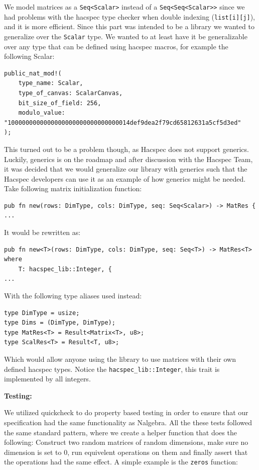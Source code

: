 \documentclass{article}
\begin{document}
We model matrices as a \texttt{Seq<Scalar>} instead of a
\texttt{Seq<Seq<Scalar>>} since we had problems with the hacspec type
checker when double indexing (\texttt{list[i][j]}), and it is more
efficient. Since this part was intended to be a library we wanted
to generalize over the \texttt{Scalar} type. We wanted to at least have it be generalizable over any type that can be defined using hacspec macros, for example the following Scalar:

\begin{lstlisting}
public_nat_mod!(
    type_name: Scalar,
    type_of_canvas: ScalarCanvas,
    bit_size_of_field: 256,
    modulo_value: "1000000000000000000000000000000014def9dea2f79cd65812631a5cf5d3ed"
);
\end{lstlisting}

This turned out to be a problem though, as Hacspec does not support
generics. Luckily, generics is on the roadmap and after discussion
with the Hacspec Team, it was decided that we would generalize our
library with generics such that the Hacspec developers can use it
as an example of how generics might be needed. Take following matrix
initialization function:

\begin{lstlisting}
pub fn new(rows: DimType, cols: DimType, seq: Seq<Scalar>) -> MatRes {
...
\end{lstlisting}

It would be rewritten as:

\begin{lstlisting}
pub fn new<T>(rows: DimType, cols: DimType, seq: Seq<T>) -> MatRes<T>
where
    T: hacspec_lib::Integer, {
...
\end{lstlisting}

With the following type aliases used instead:

\begin{lstlisting}
type DimType = usize;
type Dims = (DimType, DimType);
type MatRes<T> = Result<Matrix<T>, u8>;
type ScalRes<T> = Result<T, u8>;
\end{lstlisting}

Which would allow anyone using the library to use matrices with their
own defined hacspec types. Notice the \texttt{hacspec\_lib::Integer},
this trait is implemented by all integers.

\textbf{Testing:}

We utilized quickcheck to do property based testing in order to ensure
that our specification had the same functionality as Nalgebra. All
the these tests followed the same standard pattern, where we create a
helper function that does the following: Construct two random matrices
of random dimensions, make sure no dimension is set to 0, run equivelent
operations on them and finally assert that the operations had the same
effect. A simple example is the \texttt{zeros} function:
\end{document}
